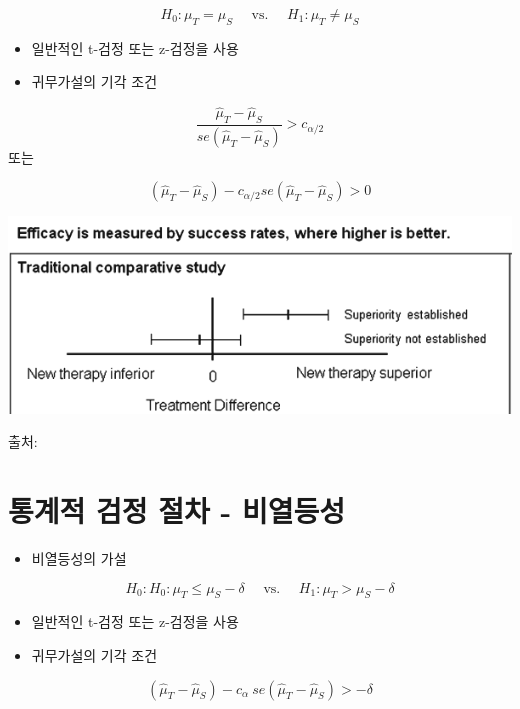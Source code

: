 \documentclass[
]{book}
\providecommand{\tightlist}{%
  \setlength{\itemsep}{0pt}\setlength{\parskip}{0pt}}
\begin{document}
\[ H_0 : \mu_T = \mu_S  \quad \text{ vs. } \quad H_1: \mu_T \ne \mu_S   \]

\begin{itemize}
\item
  일반적인 t-검정 또는 z-검정을 사용
\item
  귀무가설의 기각 조건
\end{itemize}

\[   \frac{\hat \mu_T - \hat \mu_S}{se(\hat \mu_T - \hat \mu_S)} > c_{\alpha/2} \]
또는

\[   (\hat \mu_T - \hat \mu_S) - c_{\alpha/2}  se(\hat \mu_T - \hat \mu_S) > 0  \]

\includegraphics{equiv-super.png}

출처: \citet{walker2011understanding}

\hypertarget{uxd1b5uxacc4uxc801-uxac80uxc815-uxc808uxcc28---uxbe44uxc5f4uxb4f1uxc131}{%
\section{통계적 검정 절차 - 비열등성}\label{uxd1b5uxacc4uxc801-uxac80uxc815-uxc808uxcc28---uxbe44uxc5f4uxb4f1uxc131}}

\begin{itemize}
\tightlist
\item
  비열등성의 가설
\end{itemize}

\begin{equation}
H_0 : H_0 : \mu_T \le  \mu_S - \delta  \quad \text{ vs. } \quad H_1: \mu_T > \mu_S -   \delta
\label{eq:noninf}
\end{equation}

\begin{itemize}
\item
  일반적인 t-검정 또는 z-검정을 사용
\item
  귀무가설의 기각 조건
\end{itemize}

\[   (\hat \mu_T - \hat \mu_S) - c_{\alpha} ~ se(\hat \mu_T - \hat \mu_S) > -\delta  \]
\end{document}
